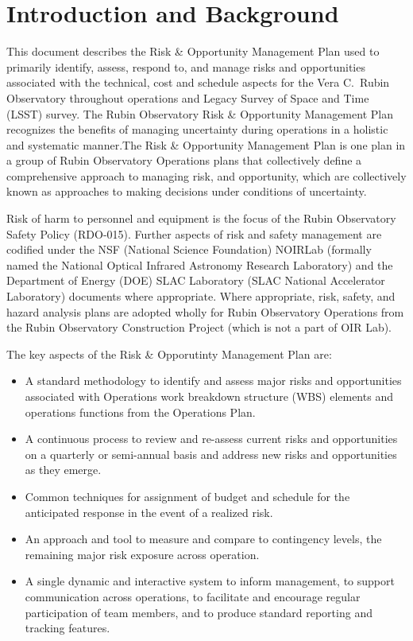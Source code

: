 \section{Introduction and Background}

This document describes the Risk \& Opportunity Management Plan used to primarily identify, assess, respond to, and manage risks and opportunities associated with the technical, cost and schedule aspects for the Vera C.\ Rubin Observatory throughout operations and Legacy Survey of Space and Time (LSST) survey.
The Rubin Observatory Risk \& Opportunity Management Plan recognizes the benefits of managing uncertainty during operations in a holistic and systematic manner.The Risk \& Opportunity Management Plan is one plan in a group of Rubin Observatory Operations plans that collectively define a comprehensive approach to managing risk, and opportunity, which are collectively known as approaches to making decisions under conditions of uncertainty.

Risk of harm to personnel and equipment is the focus of the Rubin Observatory Safety Policy (RDO-015).
Further aspects of risk and safety management are codified under the NSF (National Science Foundation) NOIRLab (formally named the National Optical Infrared Astronomy Research Laboratory) and the Department of Energy (DOE) SLAC Laboratory (SLAC National Accelerator Laboratory) documents where appropriate. Where appropriate, risk, safety, and hazard analysis plans are adopted wholly for Rubin Observatory Operations from the Rubin Observatory Construction Project (which is not a part of OIR Lab).

The key aspects of the Risk \& Opporutinty Management Plan are:
\begin{itemize}
	\item A standard methodology to identify and assess major risks and opportunities associated with Operations work breakdown structure (WBS) elements and operations functions from the Operations Plan.

	\item A continuous process to review and re-assess current risks and opportunities on a quarterly or semi-annual basis and address new risks and opportunities as they emerge.
	
	\item Common techniques for assignment of budget and schedule for the anticipated response in the event of a realized risk.
	
	\item An approach and tool to measure and compare to contingency levels, the remaining major risk exposure across operation.
	
	\item A single dynamic and interactive system to inform management, to support communication across operations, to facilitate and encourage regular participation of team members, and to produce standard reporting and tracking features.
\end{itemize}


